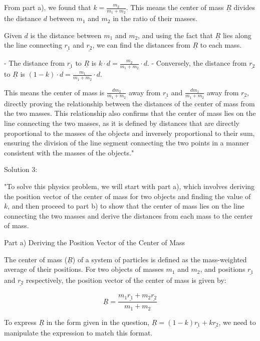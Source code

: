 From part a), we found that \( k = \frac{m_{2}}{m_{1} + m_{2}} \). This means the center of mass \( \underline{R} \) divides the distance \( d \) between \( m_{1} \) and \( m_{2} \) in the ratio of their masses.

Given \( d \) is the distance between \( m_{1} \) and \( m_{2} \), and using the fact that \( \underline{R} \) lies along the line connecting \( \underline{r_{1}} \) and \( \underline{r_{2}} \), we can find the distances from \( \underline{R} \) to each mass.

- The distance from \( \underline{r_{1}} \) to \( \underline{R} \) is \( k \cdot d = \frac{m_{2}}{m_{1} + m_{2}} \cdot d \).
- Conversely, the distance from \( \underline{r_{2}} \) to \( \underline{R} \) is \( (1-k) \cdot d = \frac{m_{1}}{m_{1} + m_{2}} \cdot d \).

This means the center of mass is \( \frac{d m_{2}}{m_{1} + m_{2}} \) away from \( \underline{r_{1}} \) and \( \frac{d m_{1}}{m_{1} + m_{2}} \) away from \( \underline{r_{2}} \), directly proving the relationship between the distances of the center of mass from the two masses. This relationship also confirms that the center of mass lies on the line connecting the two masses, as it is defined by distances that are directly proportional to the masses of the objects and inversely proportional to their sum, ensuring the division of the line segment connecting the two points in a manner consistent with the masses of the objects."

Solution 3:

"To solve this physics problem, we will start with part a), which involves deriving the position vector of the center of mass for two objects and finding the value of \( k \), and then proceed to part b) to show that the center of mass lies on the line connecting the two masses and derive the distances from each mass to the center of mass.

Part a) Deriving the Position Vector of the Center of Mass

The center of mass (\( \underline{R} \)) of a system of particles is defined as the mass-weighted average of their positions. For two objects of masses \( m_{1} \) and \( m_{2} \), and positions \( \underline{r_{1}} \) and \( \underline{r_{2}} \) respectively, the position vector of the center of mass is given by:

\[ \underline{R} = \frac{m_{1}\underline{r_{1}} + m_{2}\underline{r_{2}}}{m_{1} + m_{2}} \]

To express \( \underline{R} \) in the form given in the question, \( \underline{R} = (1-k)\underline{r_{1}} + k\underline{r_{2}} \), we need to manipulate the expression to match this format.

